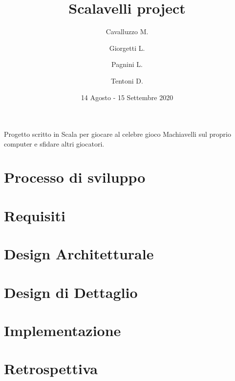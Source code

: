 \documentclass{article}
\title{Scalavelli project}
\date{14 Agosto - 15 Settembre 2020}
\author{
Cavalluzzo M.
\and
Giorgetti L.
\and
Pagnini L.
\and
Tentoni D.
}
\begin{document}
  \maketitle
  \newpage

  \begin{center}
    Progetto scritto in Scala per giocare al celebre gioco Machiavelli sul proprio computer e sfidare altri giocatori.
  \end{center}

  \tableofcontents

  \newpage


  \section{Processo di sviluppo}\label{sec:processo-di-sviluppo}
  


  \section{Requisiti}\label{sec:requisiti}
  


  \section{Design Architetturale}\label{sec:design-architetturale}
  

  \section{Design di Dettaglio}\label{sec:design-di-dettaglio}
  


  \section{Implementazione}\label{sec:implementazione}
  


  \section{Retrospettiva}\label{sec:retrospettiva}
  
\end{document}
